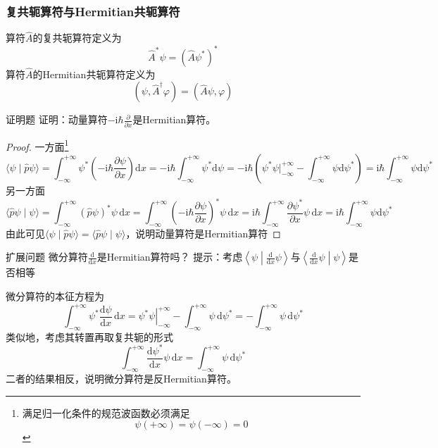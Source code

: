 \subsubsection{复共轭算符与Hermitian共轭算符}
算符$\hat{A}$的复共轭算符定义为
\begin{equation}
    \hat{A}^*\psi = \left(\hat{A}\psi^*\right)^*
\end{equation}
算符$\hat{A}$的Hermitian共轭算符定义为
\begin{equation}
    \left(\psi, \hat{A}^{\dagger}\varphi\right) = \left(\hat{A}\psi, \varphi\right)
\end{equation}
\begin{question}{证明题}
    证明：动量算符$-\mathrm{i}\hbar\frac{\partial}{\partial x}$是Hermitian算符。
\end{question}
\begin{proof}
    一方面\footnote{满足归一化条件的规范波函数必须满足$$\psi(+\infty)=\psi(-\infty)=0$$}
    $$
        \langle \psi\mid\hat{p}\psi \rangle
        = \int_{-\infty}^{+\infty}\psi^*\left(-\mathrm{i}\hbar\frac{\partial \psi}{\partial x}\right)\mathrm{d}x
        =-\mathrm{i}\hbar\int_{-\infty}^{+\infty}\psi^*\mathrm{d}\psi
        =-\mathrm{i}\hbar\left(\psi^*\psi\Big|_{-\infty}^{+\infty} - \int_{-\infty}^{+\infty}\psi\mathrm{d}\psi^*\right)
        =\mathrm{i}\hbar\int_{-\infty}^{+\infty}\psi\mathrm{d}\psi^*
    $$
    另一方面
    $$
        \langle \hat{p}\psi\mid\psi \rangle
        =\int_{-\infty}^{+\infty}\left(\hat{p}\psi\right)^*\psi\,\mathrm{d}x
        =\int_{-\infty}^{+\infty}\left(-\mathrm{i}\hbar\frac{\partial \psi}{\partial x}\right)^*\psi\,\mathrm{d}x
        =\mathrm{i}\hbar\int_{-\infty}^{+\infty}\frac{\partial \psi^*}{\partial x}\psi\,\mathrm{d}x
        =\mathrm{i}\hbar\int_{-\infty}^{+\infty}\psi\mathrm{d}\psi^*
    $$
    由此可见$\langle \psi\mid\hat{p}\psi \rangle=\langle \hat{p}\psi\mid\psi \rangle$，说明动量算符是Hermitian算符
\end{proof}
\begin{question}{扩展问题}
    微分算符$\frac{\mathrm{d}}{\mathrm{d}x}$是Hermitian算符吗？
    \tcblower
    提示：考虑$\left\langle \psi \middle| \frac{\mathrm{d}}{\mathrm{d}x}\psi\right\rangle$与$\left\langle \frac{\mathrm{d}}{\mathrm{d}x}\psi \middle| \psi\right\rangle$是否相等
\end{question}
\begin{solution}
    微分算符的本征方程为
    $$
        \int_{-\infty}^{+\infty}\psi^*\frac{\mathrm{d}\psi}{\mathrm{d}x}\,\mathrm{d}x
        =\left.\psi^*\psi\right|_{-\infty}^{+\infty}-\int_{-\infty}^{+\infty}\psi\,\mathrm{d}\psi^*
        =-\int_{-\infty}^{+\infty}\psi\,\mathrm{d}\psi^*
    $$
    类似地，考虑其转置再取复共轭的形式
    $$
        \int_{-\infty}^{+\infty}\frac{\mathrm{d}\psi^*}{\mathrm{d}x}\psi\,\mathrm{d}x
        =\int_{-\infty}^{+\infty}\psi\,\mathrm{d}\psi^*
    $$
    二者的结果相反，说明微分算符是反Hermitian算符。
\end{solution}

